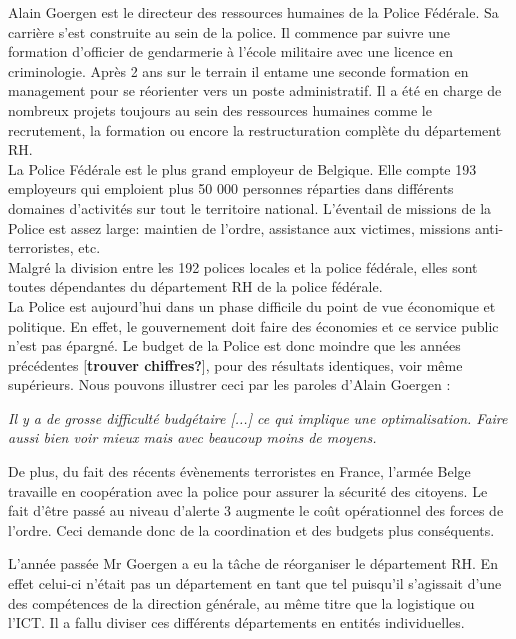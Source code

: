 
Alain Goergen est le directeur des ressources humaines de la Police Fédérale. Sa carrière s'est construite au sein de la police. Il commence par suivre une formation d'officier de gendarmerie à l'école militaire avec une licence en criminologie. Après 2 ans sur le terrain il entame une seconde formation en management pour se réorienter vers un poste administratif. Il a été en charge de nombreux projets toujours au sein des ressources humaines comme le recrutement, la formation ou encore la restructuration complète du département RH.\\

La Police Fédérale est le plus grand employeur de Belgique. Elle compte 193 employeurs qui emploient plus 50 000 personnes réparties dans différents domaines d'activités sur tout le territoire national. L'éventail de missions de la Police est assez large: maintien de l'ordre, assistance aux victimes, missions anti-terroristes, etc.\\
Malgré la division entre les 192 polices locales et la police fédérale, elles sont toutes dépendantes du département RH de la police fédérale.\\
 
La Police est aujourd'hui dans un phase difficile du point de vue économique et politique. En effet, le gouvernement doit faire des économies et ce service public n'est pas épargné. Le budget de la Police est donc moindre que les années précédentes [\textbf{trouver chiffres?}], pour des résultats identiques, voir même supérieurs. Nous pouvons illustrer ceci par les paroles d'Alain Goergen : 

\begin{center}
	\textit{Il y a de grosse difficulté budgétaire [...] ce qui implique une optimalisation. Faire aussi bien voir mieux mais avec beaucoup moins de moyens.}
\end{center} 

De plus, du fait des récents évènements terroristes en France, l'armée Belge travaille en coopération avec la police pour assurer la sécurité des citoyens. Le fait d'être passé au niveau d'alerte 3 augmente le coût opérationnel des forces de l'ordre. Ceci demande donc de la coordination et des budgets plus conséquents.

L'année passée Mr Goergen a eu la tâche de réorganiser le département RH. En effet celui-ci n'était pas un département en tant que tel puisqu'il s'agissait d'une des compétences de la direction générale, au même titre que la logistique ou l'ICT. Il a fallu diviser ces différents départements en entités individuelles.\\

